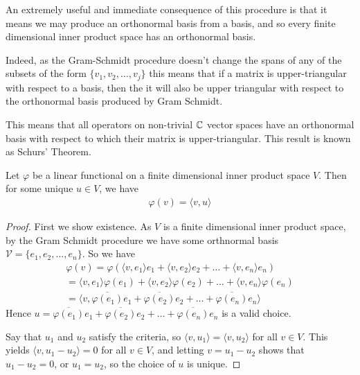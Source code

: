 \documentclass[]{article}
\begin{document}
An extremely useful and immediate consequence of this procedure is that it means we may produce an orthonormal basis from a basis, and so every finite dimensional inner product space has an orthonormal basis. 

Indeed, as the Gram-Schmidt procedure doesn't change the spans of any of the subsets of the form $\{v_1,v_2,\ldots, v_j\}$ this means that if a matrix is upper-triangular with respect to a basis, then the it will also be upper triangular with respect to the orthonormal basis produced by Gram Schmidt. 

This means that all operators on non-trivial $\mathbb{C}$ vector spaces have an orthonormal basis with respect to which their matrix is upper-triangular. This result is known as Schurs' Theorem.

\begin{thm} 
		Let $\varphi$ be a linear functional on a finite dimensional inner product space $V$. Then for some unique $u \in V$, we have
		\begin{align*}
				\varphi (v) = \langle v, u \rangle 
		\end{align*}
\end{thm}

\begin{proof}
		First we show existence. As $V$ is a finite dimensional inner product space, by the Gram Schmidt procedure we have some orthnormal basis $\mathcal{V} = \{e_1, e_2, \ldots, e_n\}$. So we have
		\begin{align*}
				\varphi(v) = \varphi(\langle v, e_1 \rangle e_1 + \langle v, e_2 \rangle e_2 + \ldots + \langle v, e_n \rangle e_n) \\
				= \langle v, e_1 \rangle \varphi(e_1) + \langle v, e_2 \rangle \varphi(e_2) + \ldots + \langle v, e_n \rangle \varphi(e_n)\\
				= \langle v, \overline{\varphi(e_1)}e_1 + \overline{\varphi(e_2)} e_2 + \ldots + \overline{\varphi(e_n)} e_n \rangle 
		\end{align*}
		Hence $u = \overline{\varphi(e_1)}e_1 + \overline{\varphi(e_2)} e_2 + \ldots + \overline{\varphi(e_n)} e_n$ is a valid choice.

		Say that $u_1$ and $u_2$ satisfy the criteria, so $\langle v, u_1 \rangle = \langle v, u_2 \rangle $ for all $v \in V$. This yields $\langle v, u_1-u_2 \rangle = 0$ for all $v \in V$, and letting $v = u_1-u_2$ shows that $u_1-u_2=0$, or $u_1 = u_2$, so the choice of $u$ is unique. 
\end{proof}
\end{document}

